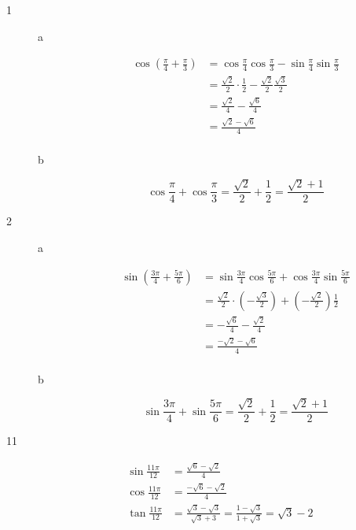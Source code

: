 \documentclass[fleqn,addpoints]{exam}
\begin{document}
\begin{description}

\item[1] 
\begin{description}

\item[a]
\begin{align*}
  \cos \left( \frac{\pi}{4} + \frac{\pi}{3} \right) &= \cos \frac{\pi}{4} \cos \frac{\pi}{3} - \sin \frac{\pi}{4} \sin \frac{\pi}{3} \\
  &= \frac{\sqrt{2}}{2} \cdot \frac{1}{2} - \frac{\sqrt{2}}{2} \frac{\sqrt{3}}{2} \\
  &= \frac{\sqrt{2}}{4} - \frac{\sqrt{6}}{4} \\
  &= \frac{\sqrt{2} - \sqrt{6}}{4} \\
\end{align*}

\item[b]
\[
  \cos \frac{\pi}{4} + \cos \frac{\pi}{3} = \frac{\sqrt{2}}{2} + \frac{1}{2} = \frac{\sqrt{2} + 1}{2}
\]

\end{description}

\item[2] 
\begin{description}

\item[a]
\begin{align*}
  \sin \left( \frac{3\pi}{4} + \frac{5\pi}{6} \right) &= \sin \frac{3\pi}{4} \cos \frac{5 \pi}{6} + \cos \frac{3 \pi}{4} \sin \frac{5 \pi}{6} \\
  &= \frac{\sqrt{2}}{2} \cdot \left( - \frac{\sqrt{3}}{2} \right) + \left( -\frac{\sqrt{2}}{2} \right) \frac{1}{2} \\
  &= - \frac{\sqrt{6}}{4} - \frac{\sqrt{2}}{4} \\
  &= \frac{-\sqrt{2} - \sqrt{6}}{4} \\
\end{align*}

\item[b]
\[
  \sin \frac{3 \pi}{4} + \sin \frac{5 \pi}{6} = \frac{\sqrt{2}}{2} + \frac{1}{2} = \frac{\sqrt{2} + 1}{2}
\]

\end{description}

\item[11]
\begin{align*}
  \sin \frac{11 \pi}{12} &= \frac{\sqrt{6} - \sqrt{2}}{4} \\
  \cos \frac{11 \pi}{12} &= \frac{-\sqrt{6} - \sqrt{2}}{4} \\
  \tan \frac{11 \pi}{12} &= \frac{\sqrt{3} - \sqrt{3}}{\sqrt{3} + 3} = \frac{1 - \sqrt{3}}{1 + \sqrt{3}}  = \sqrt{3} - 2 \\
\end{align*}


\end{description}
\end{document}
